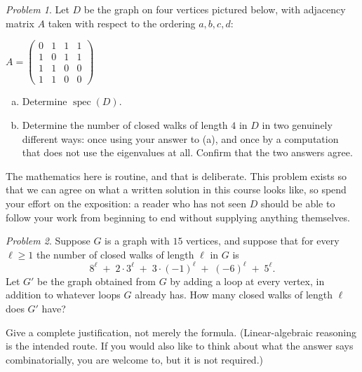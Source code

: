 \documentclass[11pt,twoside]{amsart}
\theoremstyle{plain}
\theoremstyle{remark}
\newtheorem{prob}{Problem}
\theoremstyle{definition}
\theoremstyle{definition}
\newcommand{\spec}{\operatorname{spec}}
\begin{document}
\begin{prob}
Let $D$ be the graph on four vertices pictured below, with adjacency matrix $A$ taken with
respect to the ordering $a,b,c,d$:
\begin{center}
\qquad
$A=\begin{pmatrix} 0&1&1&1\\ 1&0&1&1\\ 1&1&0&0\\ 1&1&0&0 \end{pmatrix}$
\end{center}
\begin{enumerate}[(a)]
\item Determine $\spec(D)$.
\item Determine the number of closed walks of length $4$ in $D$ in two genuinely different ways:
once using your answer to (a), and once by a computation that does not use the eigenvalues at
all. Confirm that the two answers agree.
\end{enumerate}
The mathematics here is routine, and that is deliberate. This problem exists so that we can agree
on what a written solution in this course looks like, so spend your effort on the exposition: a
reader who has not seen $D$ should be able to follow your work from beginning to end without
supplying anything themselves.
\end{prob}

\begin{prob}
Suppose $G$ is a graph with $15$ vertices, and suppose that for every $\ell\ge 1$ the number of
closed walks of length $\ell$ in $G$ is
\[
8^{\ell} \;+\; 2\cdot 3^{\ell} \;+\; 3\cdot(-1)^{\ell} \;+\; (-6)^{\ell} \;+\; 5^{\ell}.
\]
Let $G'$ be the graph obtained from $G$ by adding a loop at every vertex, in addition to whatever
loops $G$ already has. How many closed walks of length $\ell$ does $G'$ have?

\smallskip
Give a complete justification, not merely the formula. (Linear-algebraic reasoning is the
intended route. If you would also like to think about what the answer says combinatorially, you
are welcome to, but it is not required.)
\end{prob}
\end{document}
